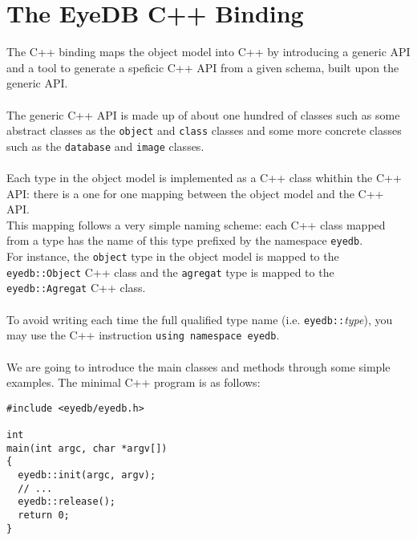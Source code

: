 

\newcommand{\mantitle}{\textsc{C++ Binding} }


\tableofcontents

\chapter{The EyeDB C++ Binding}

The C++ binding maps the \eyedb object model into C++ by introducing
a generic API
and a tool to generate a speficic C++ API from a given schema,
built upon the generic API.
\\
\\
The generic C++ API is made up of about one hundred of classes such
as some abstract classes as the \texttt{object} and \texttt{class} classes
and some more concrete classes such as the \texttt{database} and \texttt{image}
classes.
\\
\\
Each type in the \eyedb object model is implemented as a C++ class whithin
the C++ API: there is a one for one mapping between the object model and
the C++ API.
\\
This mapping follows a very simple naming scheme: each C++ class mapped from
a type has the name of this type prefixed by the namespace \texttt{eyedb}.
\\
For instance, the \texttt{object} type in the \eyedb object model is
mapped to the \texttt{eyedb::Object} C++ class and the \texttt{agregat}
type is mapped to the \texttt{eyedb::Agregat} C++ class.
\\
\\
To avoid writing each time the full qualified type name
(i.e. \texttt{eyedb::}\emph{type}), you may use the C++ instruction
\texttt{using namespace eyedb}.
\\
\\
We are going to introduce the main classes and methods through some simple
examples.
The minimal \eyedb C++ program is as follows:
\verbsize
\begin{verbatim}
#include <eyedb/eyedb.h>

int
main(int argc, char *argv[])
{
  eyedb::init(argc, argv);
  // ...
  eyedb::release();
  return 0;
}
\end{verbatim}
